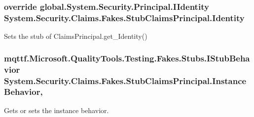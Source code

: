\hypertarget{class_system_1_1_security_1_1_claims_1_1_fakes_1_1_stub_claims_principal_a031505fd00f082a3d01e081cd5706e27}{
\subsubsection[{Identity}]{\setlength{\rightskip}{0pt plus 5cm}override global.\-System.\-Security.\-Principal.\-I\-Identity System.\-Security.\-Claims.\-Fakes.\-Stub\-Claims\-Principal.\-Identity\hspace{0.3cm}{\ttfamily [get]}}}\label{class_system_1_1_security_1_1_claims_1_1_fakes_1_1_stub_claims_principal_a031505fd00f082a3d01e081cd5706e27}


Sets the stub of Claims\-Principal.\-get\-\_\-\-Identity()

\hypertarget{class_system_1_1_security_1_1_claims_1_1_fakes_1_1_stub_claims_principal_a4a7dec317e44e3e4265cda1e665c321b}{
\subsubsection[{Instance\-Behavior}]{\setlength{\rightskip}{0pt plus 5cm}mqttf.\-Microsoft.\-Quality\-Tools.\-Testing.\-Fakes.\-Stubs.\-I\-Stub\-Behavior System.\-Security.\-Claims.\-Fakes.\-Stub\-Claims\-Principal.\-Instance\-Behavior\hspace{0.3cm}{\ttfamily [get]}, {\ttfamily [set]}}}\label{class_system_1_1_security_1_1_claims_1_1_fakes_1_1_stub_claims_principal_a4a7dec317e44e3e4265cda1e665c321b}


Gets or sets the instance behavior.

